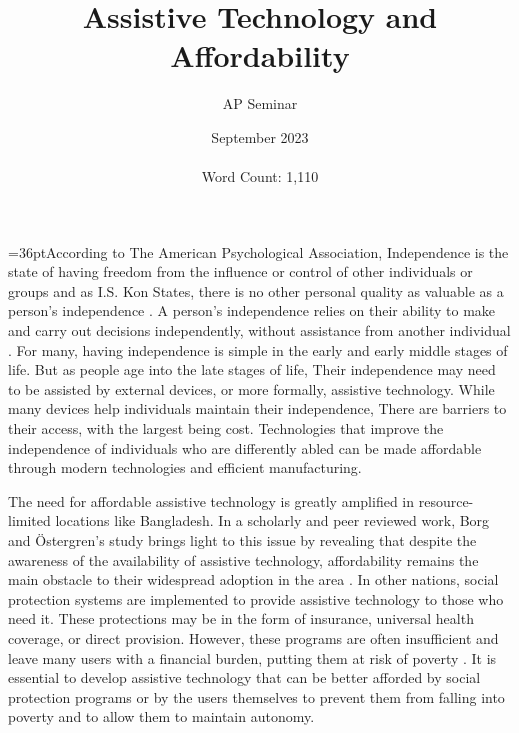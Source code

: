 \documentclass[12pt]{report}
\title{\fontsize{18}{20}\selectfont\textbf{Assistive Technology and Affordability}}
\date{September 2023 \\\phantom{.}\\ Word Count: 1,110}
\author{AP Seminar}
\begin{document}
\maketitle\newpage

\doublespacing\begin{raggedright}\parindent=36ptAccording to The American Psychological Association, 
    Independence is the state of having freedom from the influence 
    or control of other individuals or groups \parencite*[]{APA} and as I.S. Kon 
    States, there is no other personal quality as valuable as a 
    person’s independence \parencite{doi:10.2753/RES1060-9393310957}. A person’s independence relies on their ability to make and carry out decisions 
    independently, without assistance from another individual \parencite{doi:10.2753/RES1060-9393310957}. For many, having 
    independence is simple in the early and early middle stages of life.
    But as people age into the late stages of life, Their independence may 
    need to be assisted by external devices, or more formally, assistive 
    technology. While many devices help individuals 
    maintain their independence, There are barriers to their access, 
    with the largest being cost. Technologies that improve the 
    independence of individuals who are differently abled can be made 
    affordable through modern technologies and efficient manufacturing.

    \parindent=36pt
    The need for affordable assistive technology is greatly amplified in resource-limited
    locations like Bangladesh. In a scholarly and peer reviewed work, Borg and {\"O}stergren's study brings light to this issue by revealing that
    despite the awareness of the availability of assistive technology, affordability remains the main obstacle
    to their widespread adoption in the area \parencite{doi:10.3109/17483107.2014.974221}. In other nations,
    social protection systems are implemented to provide assistive technology to those who need it. These protections
    may be in the form of insurance, universal health coverage, or direct provision. However, these programs are often
    insufficient and leave many users with a financial burden, putting them at risk of poverty \parencite{doi:10.1080/10400435.2021.1994052}.
    It is essential to develop assistive technology that can be better afforded by social protection programs or by the users themselves to
    prevent them from falling into poverty and to allow them to maintain autonomy.


\end{raggedright}
\end{document}

